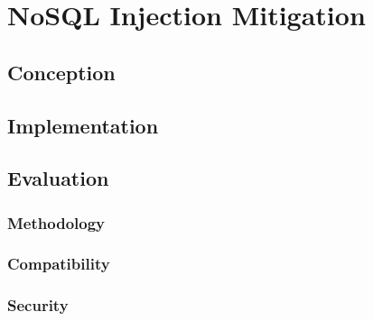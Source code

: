 \chapter{NoSQL Injection Mitigation}

\section{Conception}

\section{Implementation}

\section{Evaluation}
\label{cha:Empirical Evaluation}

\subsection{Methodology}

\subsection{Compatibility}

\subsection{Security}
